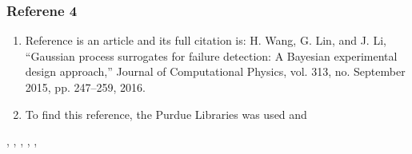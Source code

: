 \documentclass{journal}
\begin{document}
\subsubsection{Referene 4}
\begin{enumerate}
	\item Reference \cite{Wang2016} is an article and its full citation is: H. Wang, G. Lin, and J. Li, “Gaussian process surrogates for failure detection: A Bayesian experimental design approach,” Journal of Computational Physics, vol. 313, no. September 2015, pp. 247–259, 2016.
	\item To find this reference, the Purdue Libraries was used and 
\end{enumerate}


\cite{Schaul2011}, \cite{Li2014}, \cite{Pandita2016}, \cite{Costa2006}, \cite{Guo2007}, \cite{Huang2006}
\end{document}
